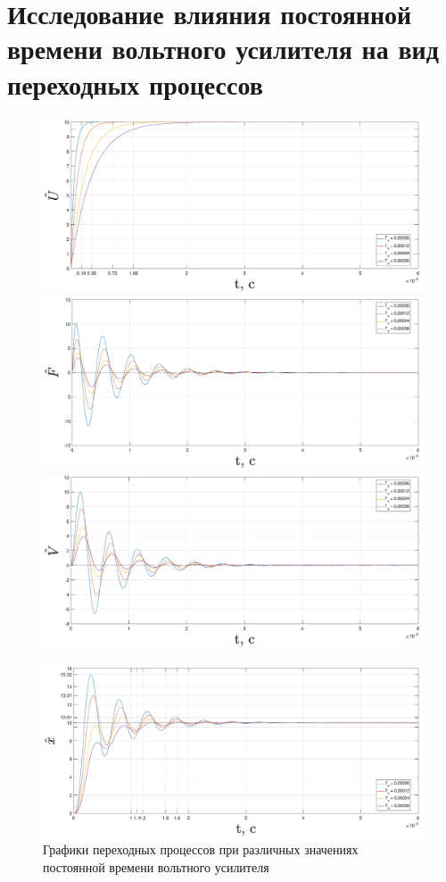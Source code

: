 \documentclass[fleqn, a4paper, 11pt, russian]{article}
\begin{document}
	\section{Исследование влияния постоянной времени вольтного усилителя на вид переходных процессов}
	\begin{figure}[ht!]
		\centering
		\includegraphics[width = \textwidth]{tvar/tvarU}
		
		\includegraphics[width = \textwidth]{tvar/tvarF}
		
		\includegraphics[width = \textwidth]{tvar/tvarV}
	\end{figure}
	\begin{figure}[ht!]
		\includegraphics[width = \textwidth]{tvar/tvarX}
		\caption{Графики переходных процессов при различных значениях постоянной времени вольтного усилителя}
		\label{tvarGraph}
	\end{figure}
\end{document}
